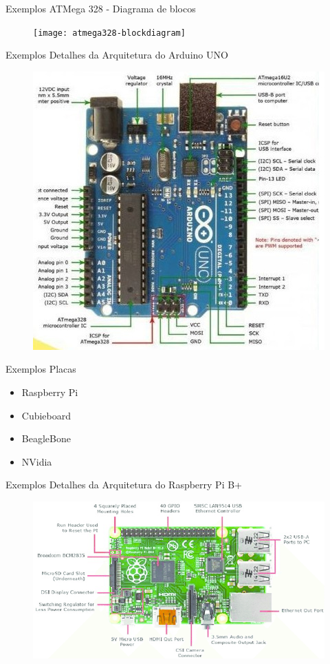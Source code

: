 \documentclass[t]{beamer}
\begin{document}
\begin{frame}{Exemplos}
ATMega 328 - Diagrama de blocos
\begin{figure}
\texttt{[image: atmega328-blockdiagram]}
\end{figure}
\end{frame}

\begin{frame}{Exemplos}
	Detalhes da Arquitetura do Arduino UNO
	\begin{figure}
		\includegraphics[width=0.7\linewidth]{arduino-uno-board}
	\end{figure}
\end{frame}

\begin{frame}{Exemplos}
Placas
\begin{itemize}
\item Raspberry Pi
\item Cubieboard
\item BeagleBone
\item NVidia
\end{itemize}
\end{frame}

\begin{frame}{Exemplos}
	Detalhes da Arquitetura do Raspberry Pi B+
	\begin{figure}
		\includegraphics[width=\linewidth]{Raspberry-pi-B-model}
	\end{figure}
\end{frame}
\end{document}
